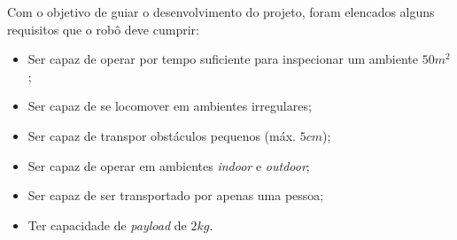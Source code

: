 \documentclass[../main.tex]{subfiles}
\begin{document}
Com o objetivo de guiar o desenvolvimento do projeto, foram elencados alguns requisitos que o robô deve cumprir:

\begin{itemize}
  \item Ser capaz de operar por tempo suficiente para inspecionar um ambiente $50m^2$;
  \item Ser capaz de se locomover em ambientes irregulares;
  \item Ser capaz de transpor obstáculos pequenos (máx. $5cm$);
  \item Ser capaz de operar em ambientes \textit{indoor} e \textit{outdoor};
  \item Ser capaz de ser transportado por apenas uma pessoa;
  \item Ter capacidade de \textit{payload} de $2kg$.
\end{itemize}
\end{document}
